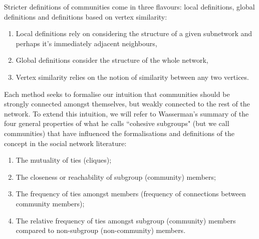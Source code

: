 Stricter definitions of communities come in three flavours: local definitions, global definitions and definitions based on vertex similarity: 

\begin{enumerate}
    \item Local definitions rely on considering the structure of a given subnetwork and perhaps it's immediately adjacent neighbours,
    \item Global definitions consider the structure of the whole network,
    \item Vertex similarity relies on the notion of similarity between any two vertices.
\end{enumerate}

Each method seeks to formalise our intuition that communities should be strongly connected amongst themselves, but weakly connected to the rest of the network. To extend this intuition, we will refer to Wasserman's summary of the four general properties of what he calls ``cohesive subgroups" (but we call communities) that have influenced the formalisations and definitions of the concept in the social network literature\cite[251-252]{wasserman_faust_1994}:

\begin{enumerate}
    \item The mutuality of ties (cliques);
    \item The closeness or reachability of subgroup (community) members;
    \item The frequency of ties amongst members (frequency of connections between community members);
    \item The relative frequency of ties amongst subgroup (community) members compared to non-subgroup (non-community) members.
\end{enumerate}

%

